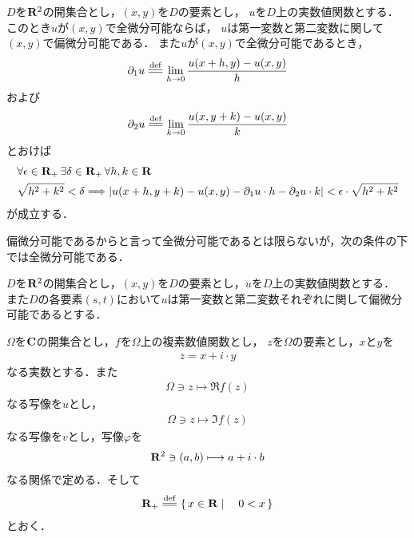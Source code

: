 	\begin{screen}
		\begin{thm}[全微分可能なら偏微分可能]
			$D$を$\mathbf{R}^2$の開集合とし，$(x,y)$を$D$の要素とし，
			$u$を$D$上の実数値関数とする．このとき$u$が$(x,y)$で全微分可能ならば，
			$u$は第一変数と第二変数に関して$(x,y)$で偏微分可能である．
			また$u$が$(x,y)$で全微分可能であるとき，
			\begin{align}
				\partial_1 u \defeq \lim_{h \to 0} \frac{u(x+h,y) - u(x,y)}{h}
			\end{align}
			および
			\begin{align}
				\partial_2 u \defeq \lim_{k \to 0} \frac{u(x,y+k) - u(x,y)}{k}
			\end{align}
			とおけば
			\begin{align}
				&\forall \epsilon \in \mathbf{R}_+\, \exists \delta \in \mathbf{R}_+\, \forall h,k \in \mathbf{R}\, \\
				&\sqrt{h^2 + k^2} < \delta \Longrightarrow
				\left|u(x+h,y+k) - u(x,y) - \partial_1 u \cdot h - \partial_2 u \cdot k\right| 
				< \epsilon \cdot \sqrt{h^2 + k^2}
			\end{align}
			が成立する．
		\end{thm}
	\end{screen}
	
	偏微分可能であるからと言って全微分可能であるとは限らないが，次の条件の下では全微分可能である．
	
	\begin{screen}
		\begin{thm}[偏導関数が連続なら全微分可能]
			$D$を$\mathbf{R}^2$の開集合とし，$(x,y)$を$D$の要素とし，$u$を$D$上の実数値関数とする．
			また$D$の各要素$(s,t)$において$u$は第一変数と第二変数それぞれに関して偏微分可能であるとする．
			
		\end{thm}
	\end{screen}

	$\Omega$を$\mathbf{C}$の開集合とし，$f$を$\Omega$上の複素数値関数とし，
	$z$を$\Omega$の要素とし，$x$と$y$を
	\begin{align}
		z = x + i \cdot y
	\end{align}
	なる実数とする．また
	\begin{align}
		\Omega \ni z \longmapsto \Re{f(z)}
	\end{align}
	なる写像を$u$とし，
	\begin{align}
		\Omega \ni z \longmapsto \Im{f(z)}
	\end{align}
	なる写像を$v$とし，写像$\varphi$を
	\begin{align}
		\mathbf{R}^2 \ni (a,b) \longmapsto a + i \cdot b
	\end{align}
	なる関係で定める．そして
	\begin{align}
		\R_+ \defeq \Set{x \in \R}{0 < x}
	\end{align}
	とおく．
	
